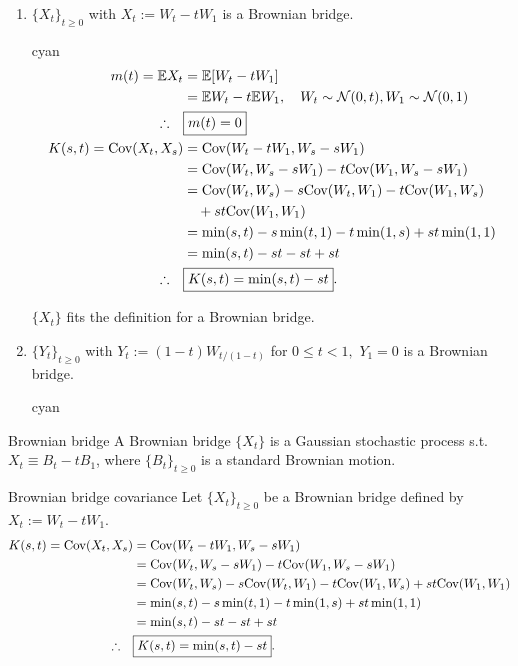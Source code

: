 \begin{enumerate}[label=(\roman*)] 
\item %
$\{X_t\}_{t\geq 0}$ with $X_t:= W_t - tW_1$ is a Brownian bridge.

\begin{mybox}{cyan}{}
\begin{align*}
m(t) = \mathbb{E} X_t 
	&= \mathbb{E}[W_t - tW_1] \\
	&= \mathbb{E} W_t - t\mathbb{E} W_1 , \quad W_t\sim\mathcal{N}(0, t), 
		W_1 \sim \mathcal{N}(0, 1)\\
\therefore\quad & \boxed{ m(t) =  0 } \\
K(s,t) = \text{Cov}(X_t, X_s) 
	&= \text{Cov}(W_t - tW_1, W_s - sW_1) \\
	&= \text{Cov}(W_t, W_s - sW_1) -t\text{Cov}(W_1, W_s - s W_1) \\
	&= \text{Cov}(W_t, W_s) -s\text{Cov}(W_t, W_1) 
		-t\text{Cov}(W_1, W_s) \\ &\quad  + st\text{Cov}(W_1, W_1) \\
	&= \min(s,t) - s\min(t, 1) -t\min(1, s) + st\min(1, 1) \\
	&= \min(s, t) - st - st + st \\
\therefore\quad& \boxed{ K(s, t) = \min(s, t) - st }.
\end{align*}

$\{X_t\}$ fits the definition for a Brownian bridge. 
\end{mybox} %

\item %
$\{Y_t\}_{t\geq 0 }$ with $Y_t := (1- t) W_{t/(1-t)}$ for $0\leq t < 1,$ $Y_1 = 0$ is a Brownian bridge.

\begin{mybox}{cyan}{}

\end{mybox} %
\end{enumerate} %

\begin{definition}{Brownian bridge}{}
	A Brownian bridge $\{X_t\}$ is a Gaussian stochastic process s.t. $X_t \equiv B_t - tB_1$, where $\{B_t\}_{t\geq 0}$ is a standard Brownian motion.  
\end{definition}

\begin{fact}{Brownian bridge covariance}{}
Let $\{X_t\}_{t\geq 0}$ be a Brownian bridge defined by $X_t:= W_t - tW_1$.
\begin{align*}
K(s,t) = \text{Cov}(X_t, X_s) 
	&= \text{Cov}(W_t - tW_1, W_s - sW_1) \\
	&= \text{Cov}(W_t, W_s - sW_1) -t\text{Cov}(W_1, W_s - s W_1) \\
	&= \text{Cov}(W_t, W_s) -s\text{Cov}(W_t, W_1) 
		-t\text{Cov}(W_1, W_s) + st\text{Cov}(W_1, W_1) \\
	&= \min(s,t) - s\min(t, 1) -t\min(1, s) + st\min(1, 1) \\
	&= \min(s, t) - st - st + st \\
\therefore\quad& \boxed{ K(s, t) = \min(s, t) - st }.
\end{align*}
\end{fact}

